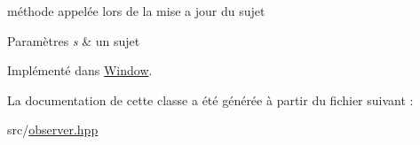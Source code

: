 méthode appelée lors de la mise a jour du sujet 


\begin{DoxyParams}{Paramètres}
{\em s} & un sujet \\
\hline
\end{DoxyParams}


Implémenté dans \hyperlink{classWindow_a23acb0c66756df8121ce5d54a8c28d72}{Window}.



La documentation de cette classe a été générée à partir du fichier suivant \+:\begin{DoxyCompactItemize}
\item 
src/\hyperlink{observer_8hpp}{observer.\+hpp}\end{DoxyCompactItemize}
